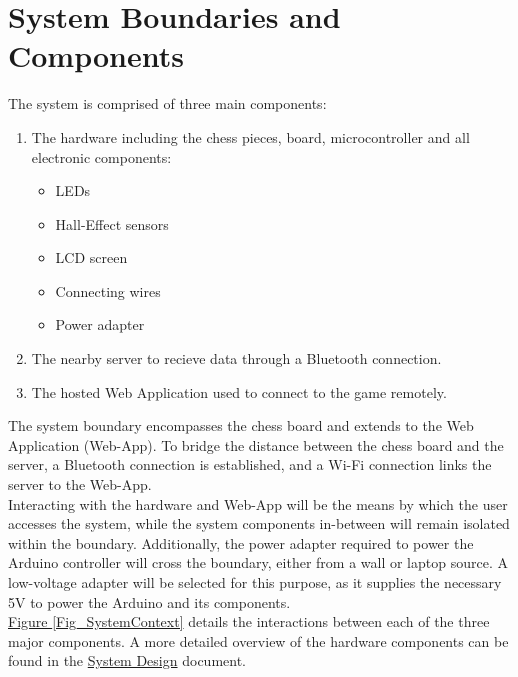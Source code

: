 \documentclass{article}
\begin{document}
\section{System Boundaries and Components}{
    The \progname{} system is comprised of three main components:
    \begin{enumerate}
        \item The hardware including the chess pieces, board, microcontroller and all electronic components:
        \begin{itemize}
            \item LEDs
            \item Hall-Effect sensors
            \item LCD screen
            \item Connecting wires
            \item Power adapter
        \end{itemize}
        \item The nearby server to recieve data through a Bluetooth connection.
        \item The hosted Web Application used to connect to the game remotely.
    \end{enumerate}

    The system boundary encompasses the chess board and extends to the Web Application (Web-App). 
    To bridge the distance between the chess board and the server, a Bluetooth connection is established, 
    and a Wi-Fi connection links the server to the Web-App. \\

    Interacting with the hardware and Web-App will be the means by which the user accesses the system, 
    while the system components in-between will remain isolated within the boundary. 
    Additionally, the power adapter required to power the Arduino controller will cross the boundary, 
    either from a wall or laptop source. A low-voltage adapter will be selected for this purpose, as it 
    supplies the necessary 5V to power the Arduino and its components.\\

    \hyperref[Fig_SystemContext]{Figure \ref{Fig_SystemContext}} details the interactions between each of the three major components. 
    A more detailed overview of the hardware components can be found in the \href{file:../Design/SystDesign/SystDes.pdf}{System Design} document.

}
\end{document}
